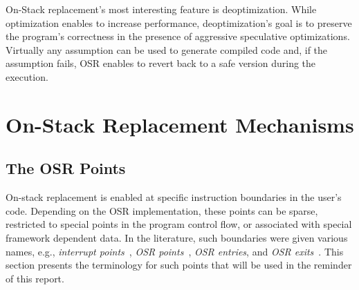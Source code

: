 On-Stack replacement's most interesting feature is deoptimization. 
While optimization enables to increase performance, deoptimization's goal is to preserve the program's correctness in the presence of aggressive speculative optimizations. 
Virtually any assumption can be used to generate compiled code and, if the assumption fails, 
OSR enables to revert back to a safe version during the execution.\\

\section{On-Stack Replacement Mechanisms}

\subsection{The OSR Points}\label{section:osrpoints}
On-stack replacement is enabled at specific instruction boundaries in the user's code.
Depending on the OSR implementation, these points can be sparse, restricted to special points in the program control flow, or associated with special framework dependent data.
In the literature, such boundaries were given various names, e.g., \textit{interrupt points}~\cite{holzle1992debugging}, \textit{OSR points}~\cite{fink2003design, holzle1992debugging, WebKitURL, lameed2013modular}, \textit{OSR entries}, and \textit{OSR exits}~\cite{WebKitURL, lameed2013modular}.
This section presents the terminology for such points that will be used in the reminder of this report.

